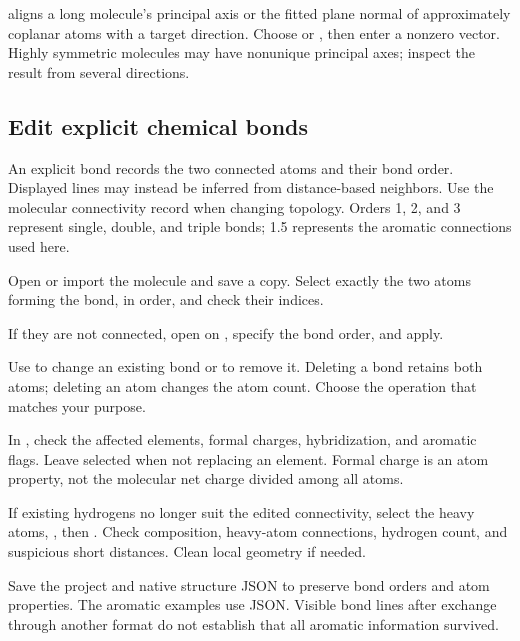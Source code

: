  aligns a long molecule's principal axis or the fitted plane normal of approximately coplanar atoms with a target direction. Choose  or , then enter a nonzero vector. Highly symmetric molecules may have nonunique principal axes; inspect the result from several directions.

\subsection{Edit explicit chemical bonds}\label{sec:bond-edit-reference}

An explicit bond records the two connected atoms and their bond order. Displayed lines may instead be inferred from distance-based neighbors. Use the molecular connectivity record when changing topology. Orders 1, 2, and 3 represent single, double, and triple bonds; 1.5 represents the aromatic connections used here.

\begin{steps}
  \item Open or import the molecule and save a copy. Select exactly the two atoms forming the bond, in order, and check their indices.
  \item If they are not connected, open  on , specify the bond order, and apply.
  \item Use  to change an existing bond or  to remove it. Deleting a bond retains both atoms; deleting an atom changes the atom count. Choose the operation that matches your purpose.
  \item In , check the affected elements, formal charges, hybridization, and aromatic flags. Leave  selected when not replacing an element. Formal charge is an atom property, not the molecular net charge divided among all atoms.
  \item If existing hydrogens no longer suit the edited connectivity, select the heavy atoms, , then . Check composition, heavy-atom connections, hydrogen count, and suspicious short distances. Clean local geometry if needed.
  \item Save the project and native structure JSON to preserve bond orders and atom properties. The aromatic examples use JSON. Visible bond lines after exchange through another format do not establish that all aromatic information survived.
\end{steps}

